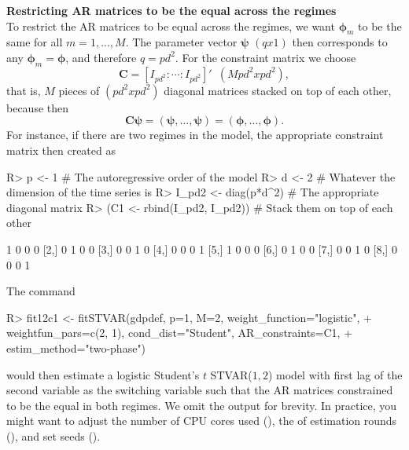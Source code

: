 \documentclass[nojss]{jss}
\begin{document}
\textbf{Restricting AR matrices to be the equal across the regimes}\\
To restrict the AR matrices to be equal across the regimes, we want $\boldsymbol{\phi}_m$ to be the same for all $m=1,...,M$. The parameter vector $\boldsymbol{\psi}$ $(qx1)$ then corresponds to any $\boldsymbol{\phi}_m=\boldsymbol{\phi}$, and therefore $q=pd^2$. For the constraint matrix we choose
\begin{equation}
\boldsymbol{C} = [I_{pd^2}:\cdots:I_{pd^2}]' \enspace (Mpd^2xpd^2),
\end{equation}
that is, $M$ pieces of $(pd^2xpd^2)$ diagonal matrices stacked on top of each other, because then
\begin{equation}
\boldsymbol{C}\boldsymbol{\psi}=(\boldsymbol{\psi},...,\boldsymbol{\psi})=(\boldsymbol{\phi},...,\boldsymbol{\phi}).
\end{equation}
For instance, if there are two regimes in the model, the appropriate constraint matrix then created as
%
\begin{CodeChunk}
\begin{CodeInput}
R> p <- 1 # The autoregressive order of the model
R> d <- 2 # Whatever the dimension of the time series is
R> I_pd2 <- diag(p*d^2) # The appropriate diagonal matrix
R> (C1 <- rbind(I_pd2, I_pd2)) # Stack them on top of each other
\end{CodeInput}
\begin{CodeOutput}
     [,1] [,2] [,3] [,4]
[1,]    1    0    0    0
[2,]    0    1    0    0
[3,]    0    0    1    0
[4,]    0    0    0    1
[5,]    1    0    0    0
[6,]    0    1    0    0
[7,]    0    0    1    0
[8,]    0    0    0    1
\end{CodeOutput}
\end{CodeChunk}
%
The command
\begin{CodeChunk}
\begin{CodeInput}
R> fit12c1 <- fitSTVAR(gdpdef, p=1, M=2, weight_function="logistic",
+    weightfun_pars=c(2, 1), cond_dist="Student", AR_constraints=C1,
+    estim_method="two-phase")
\end{CodeInput}
\end{CodeChunk}
would then estimate a logistic Student's $t$ STVAR($1,2$) model with first lag of the second variable as the switching variable such that the AR matrices constrained to be the equal in both regimes. We omit the output for brevity. In practice, you might want to adjust the number of CPU cores used (), the of estimation rounds (), and set seeds ().
\end{document}

